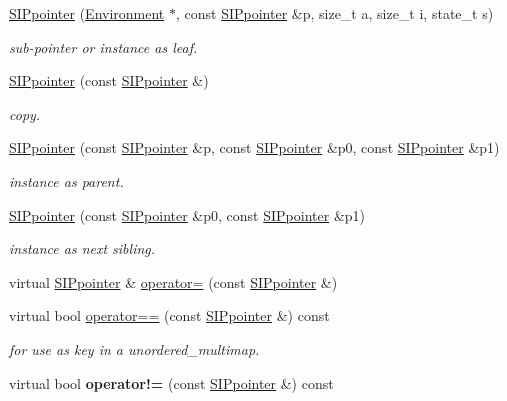 \begin{DoxyCompactItemize}
\mbox{\hyperlink{group__table_gad83be64e20b13419994b3e9ae23654d1}{S\+I\+Ppointer}} (\mbox{\hyperlink{classEnvironment}{Environment}} $\ast$, const \mbox{\hyperlink{classSIPpointer}{S\+I\+Ppointer}} \&p, size\+\_\+t a, size\+\_\+t i, state\+\_\+t s)
\begin{DoxyCompactList}\small\item\em sub-\/pointer or instance as leaf. \end{DoxyCompactList}\item 
\mbox{\hyperlink{group__table_ga32c45b7b04d59e932c5b43ba03b47b4e}{S\+I\+Ppointer}} (const \mbox{\hyperlink{classSIPpointer}{S\+I\+Ppointer}} \&)
\begin{DoxyCompactList}\small\item\em copy. \end{DoxyCompactList}\item 
\mbox{\hyperlink{group__table_gaa4c3c43c081bf789120e96683bc70cb3}{S\+I\+Ppointer}} (const \mbox{\hyperlink{classSIPpointer}{S\+I\+Ppointer}} \&p, const \mbox{\hyperlink{classSIPpointer}{S\+I\+Ppointer}} \&p0, const \mbox{\hyperlink{classSIPpointer}{S\+I\+Ppointer}} \&p1)
\begin{DoxyCompactList}\small\item\em instance as parent. \end{DoxyCompactList}\item 
\mbox{\hyperlink{group__table_ga12c22407821e96d6c7d0bca88392cbda}{S\+I\+Ppointer}} (const \mbox{\hyperlink{classSIPpointer}{S\+I\+Ppointer}} \&p0, const \mbox{\hyperlink{classSIPpointer}{S\+I\+Ppointer}} \&p1)
\begin{DoxyCompactList}\small\item\em instance as next sibling. \end{DoxyCompactList}\item 
virtual \mbox{\hyperlink{classSIPpointer}{S\+I\+Ppointer}} \& \mbox{\hyperlink{group__table_ga9855eef9600bbdd1e74343844e0c158c}{operator=}} (const \mbox{\hyperlink{classSIPpointer}{S\+I\+Ppointer}} \&)
\item 
virtual bool \mbox{\hyperlink{group__table_ga519f21be86b2ddb4fae2bab869434863}{operator==}} (const \mbox{\hyperlink{classSIPpointer}{S\+I\+Ppointer}} \&) const
\begin{DoxyCompactList}\small\item\em for use as key in a unordered\+\_\+multimap. \end{DoxyCompactList}\item 
virtual bool {\bfseries operator!=} (const \mbox{\hyperlink{classSIPpointer}{S\+I\+Ppointer}} \&) const

\end{DoxyCompactItemize}
